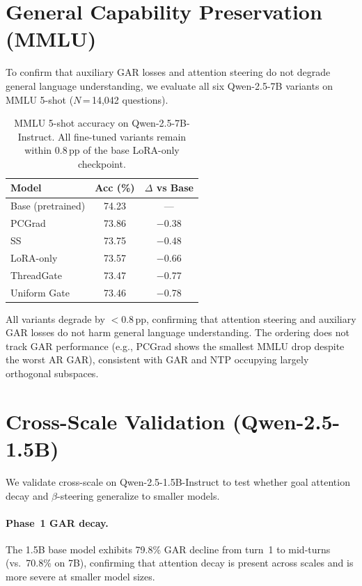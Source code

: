 \section{General Capability Preservation (MMLU)}\label{sec:appendix-mmlu}

To confirm that auxiliary GAR losses and attention steering do not degrade general language understanding, we evaluate all six Qwen-2.5-7B variants on MMLU 5-shot \citep{hendrycks2021measuring} ($N$\,=\,14{,}042 questions).

\begin{table}[t]
\centering\small
\caption{MMLU 5-shot accuracy on Qwen-2.5-7B-Instruct. All fine-tuned variants remain within 0.8\,pp of the base LoRA-only checkpoint.}
\label{tab:mmlu}
\begin{tabular}{lcc}
\toprule
\textbf{Model} & \textbf{Acc (\%)} & \textbf{$\Delta$ vs Base} \\
\midrule
Base (pretrained) & 74.23 & --- \\
PCGrad & 73.86 & $-$0.38 \\
SS & 73.75 & $-$0.48 \\
LoRA-only & 73.57 & $-$0.66 \\
ThreadGate & 73.47 & $-$0.77 \\
Uniform Gate & 73.46 & $-$0.78 \\
\bottomrule
\end{tabular}
\end{table}

All variants degrade by $<$0.8\,pp, confirming that attention steering and auxiliary GAR losses do not harm general language understanding. The ordering does not track GAR performance (e.g., PCGrad shows the smallest MMLU drop despite the worst AR GAR), consistent with GAR and NTP occupying largely orthogonal subspaces.

\section{Cross-Scale Validation (Qwen-2.5-1.5B)}\label{sec:appendix-1.5b}

We validate cross-scale on Qwen-2.5-1.5B-Instruct to test whether goal attention decay and $\beta$-steering generalize to smaller models.

\paragraph{Phase~1 GAR decay.} The 1.5B base model exhibits 79.8\% GAR decline from turn~1 to mid-turns (vs.\ 70.8\% on 7B), confirming that attention decay is present across scales and is more severe at smaller model sizes.

